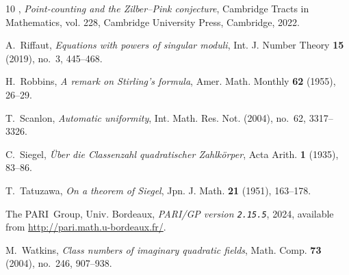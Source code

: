 \documentclass[11pt,a4paper, british]{amsart}
\theoremstyle{definition}
\theoremstyle{remark}
\numberwithin{equation}{section}
\begin{document}
\begin{thebibliography}{10}
		\bysame, \emph{Point-counting and the {Z}ilber--{P}ink conjecture}, Cambridge
		Tracts in Mathematics, vol. 228, Cambridge University Press, Cambridge, 2022.
		
		A.~Riffaut, \emph{Equations with powers of singular moduli}, Int. J. Number
		Theory \textbf{15} (2019), no.~3, 445--468.
		
		H.~Robbins, \emph{A remark on {S}tirling's formula}, Amer. Math. Monthly
		\textbf{62} (1955), 26--29.
		
		T.~Scanlon, \emph{Automatic uniformity}, Int. Math. Res. Not. (2004), no.~62,
		3317--3326.
		
		C.~Siegel, \emph{{\"U}ber die {Classenzahl} quadratischer {Zahlk{\"o}rper}},
		Acta Arith. \textbf{1} (1935), 83--86.
		
		T.~Tatuzawa, \emph{On a theorem of {S}iegel}, Jpn. J. Math. \textbf{21} (1951),
		163--178.
		
		{The PARI~Group}, Univ. Bordeaux, \emph{{PARI/GP version \texttt{2.15.5}}},
		2024, available from \url{http://pari.math.u-bordeaux.fr/}.
		
		M.~Watkins, \emph{Class numbers of imaginary quadratic fields}, Math. Comp.
		\textbf{73} (2004), no.~246, 907--938.
		
	\end{thebibliography}
	
	

	
\end{document}
